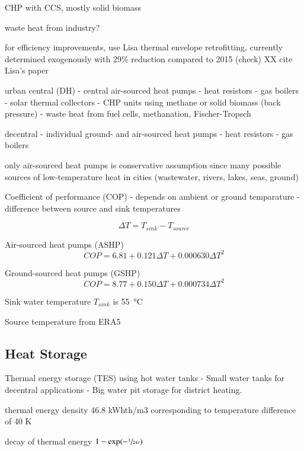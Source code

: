 CHP with CCS, mostly solid biomass

waste heat from industry?

for efficiency improvements, use Lisa thermal envelope retrofitting, currently
determined exogenously with 29\% reduction compared to 2015 (check) XX cite
Lisa's paper 

urban central (DH)
- central air-sourced heat pumps
- heat resistors
- gas boilers
- solar thermal collectors
- CHP units using methane or solid biomass (back pressure)
- waste heat from fuel cells, methanation, Fischer-Tropsch

decentral
- individual ground- and air-sourced heat pumps
- heat resistors
- gas boilers

only air-sourced heat pumps is conservative assumption since many possible sources of
low-temperature heat in cities (wastewater, rivers, lakes, seas, ground)

Coefficient of performance (COP)
- depends on ambient or ground temparature
- difference between source and sink temperatures

\begin{equation}
    \Delta T = T_{sink} - T_{source}
\end{equation}

Air-sourced heat pumps (ASHP)
\begin{equation}
    COP = 6.81 + 0.121 \Delta T + 0.000630 \Delta T^2
\end{equation}

Ground-sourced heat pumps (GSHP)
\begin{equation}
    COP = 8.77 + 0.150 \Delta T + 0.000734 \Delta T^2
\end{equation}

Sink water temperature $T_{sink}$ is \SI{55}{\celsius}

Source temperature from ERA5

\subsection{Heat Storage}

Thermal energy storage (TES) using hot water tanks
- Small water tanks for decentral applications
- Big water pit storage for district heating.

thermal energy density 46.8 kWhth/m3 corresponding to temperature difference of 40 K

decay of thermal energy $1-\exp(-\sfrac{1}{24\tau})$

